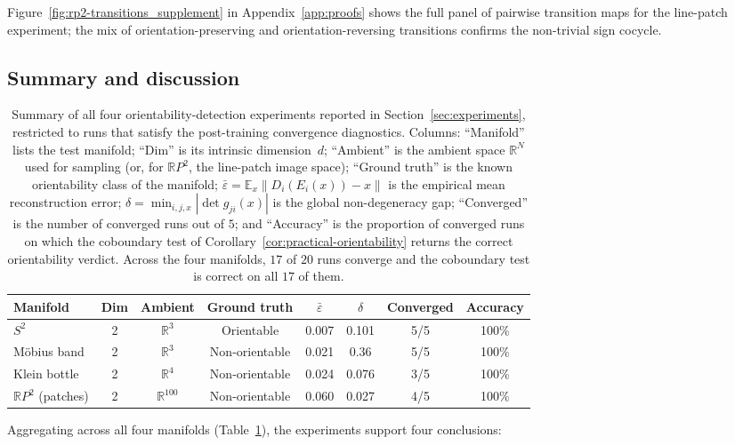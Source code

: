 \documentclass[11pt]{article}
\newcommand{\R}{\mathbb{R}}
\theoremstyle{plain}
\theoremstyle{definition}
\theoremstyle{remark}
\begin{document}
Figure~\ref{fig:rp2-transitions_supplement} in Appendix~\ref{app:proofs} shows the full panel of pairwise transition maps for the line-patch experiment; the mix of orientation-preserving and orientation-reversing transitions confirms the non-trivial sign cocycle.

\subsection{Summary and discussion}\label{sec:exp-summary}

\begin{table}[ht]
\centering
\caption{Summary of all four orientability-detection experiments
reported in Section~\ref{sec:experiments}, restricted to runs that
satisfy the post-training convergence diagnostics. Columns:
``Manifold'' lists the test manifold; ``Dim'' is its intrinsic
dimension~$d$; ``Ambient'' is the ambient space $\R^N$ used for
sampling (or, for $\mathbb{R}P^2$, the line-patch image space);
``Ground truth'' is the known orientability class of the manifold;
$\bar\varepsilon=\mathbb{E}_x\|D_i(E_i(x))-x\|$ is the empirical mean
reconstruction error; $\delta=\min_{i,j,x}|\det g_{ji}(x)|$ is the
global non-degeneracy gap; ``Converged'' is the number of converged
runs out of $5$; and ``Accuracy'' is the proportion of converged
runs on which the coboundary test of
Corollary~\ref{cor:practical-orientability} returns the correct
orientability verdict. Across the four manifolds, $17$ of $20$ runs
converge and the coboundary test is correct on all $17$ of them.}
\label{tab:summary_all}
\begin{tabular}{lccccccc}
\toprule
Manifold & Dim & Ambient & Ground truth & $\bar\varepsilon$ & $\delta$ & Converged & Accuracy \\
\midrule
$S^2$                       & 2 & $\R^3$    & Orientable     & 0.007 & 0.101 & 5/5 & 100\% \\
M\"obius band               & 2 & $\R^3$    & Non-orientable & 0.021 & 0.36  & 5/5 & 100\% \\
Klein bottle                & 2 & $\R^4$    & Non-orientable & 0.024 & 0.076 & 3/5 & 100\% \\
$\mathbb{R}P^2$ (patches)   & 2 & $\R^{100}$& Non-orientable & 0.060 & 0.027 & 4/5 & 100\% \\
\bottomrule
\end{tabular}
\end{table}

Aggregating across all four manifolds (Table~\ref{tab:summary_all}), the experiments support four conclusions:
\end{document}
